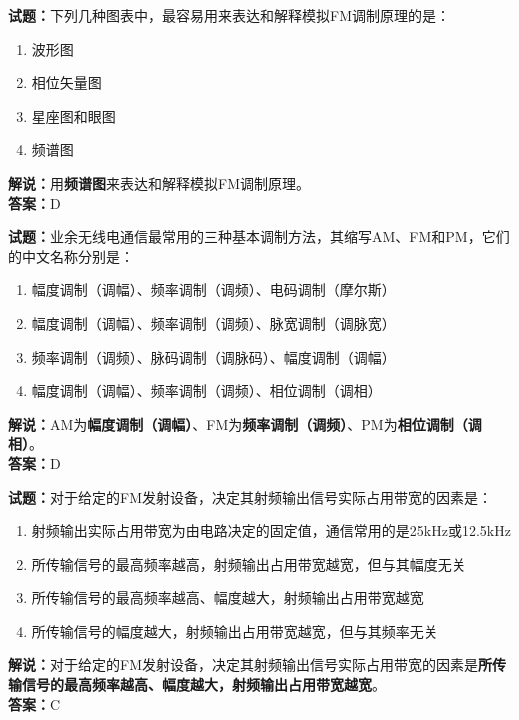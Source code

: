 \documentclass{ctexbook}
\begin{document}
\bigskip

\noindent\textbf{试题：}下列几种图表中，最容易用来表达和解释模拟FM调制原理的是：

\begin{enumerate}[leftmargin=3em]
  \item 波形图
  \item 相位矢量图
  \item 星座图和眼图
  \item 频谱图
\end{enumerate}

\noindent\textbf{解说：}用\textbf{频谱图}来表达和解释模拟FM调制原理。\\\noindent\textbf{答案：}D%

\bigskip

\noindent\textbf{试题：}业余无线电通信最常用的三种基本调制方法，其缩写AM、FM和PM，它们的中文名称分别是：

\begin{enumerate}[leftmargin=3em]
  \item 幅度调制（调幅）、频率调制（调频）、电码调制（摩尔斯）
  \item 幅度调制（调幅）、频率调制（调频）、脉宽调制（调脉宽）
  \item 频率调制（调频）、脉码调制（调脉码）、幅度调制（调幅）
  \item 幅度调制（调幅）、频率调制（调频）、相位调制（调相）
\end{enumerate}

\noindent\textbf{解说：}AM为\textbf{幅度调制（调幅）}、FM为\textbf{频率调制（调频）}、PM为\textbf{相位调制（调相）}。\\\noindent\textbf{答案：}D%

\bigskip

\noindent\textbf{试题：}对于给定的FM发射设备，决定其射频输出信号实际占用带宽的因素是：

\begin{enumerate}[leftmargin=3em]
  \item 射频输出实际占用带宽为由电路决定的固定值，通信常用的是25\si{\kHz}或12.5\si{\kHz}
  \item 所传输信号的最高频率越高，射频输出占用带宽越宽，但与其幅度无关
  \item 所传输信号的最高频率越高、幅度越大，射频输出占用带宽越宽
  \item 所传输信号的幅度越大，射频输出占用带宽越宽，但与其频率无关
\end{enumerate}

\noindent\textbf{解说：}对于给定的FM发射设备，决定其射频输出信号实际占用带宽的因素是\textbf{所传输信号的最高频率越高、幅度越大，射频输出占用带宽越宽}。\\\noindent\textbf{答案：}C%
\end{document}
